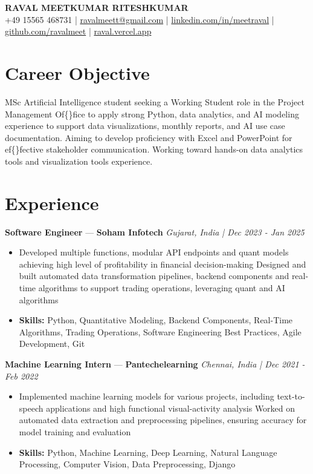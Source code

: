 \documentclass[a4paper,10pt]{article}
\begin{document}
\begin{center}
  {\Large\bfseries RAVAL MEETKUMAR RITESHKUMAR}\\[2pt]
  {\small +49 15565 468731 \;|\; \href{mailto:ravalmeett@gmail.com}{ravalmeett@gmail.com} \;|\; \href{https://www.linkedin.com/in/meetraval/}{linkedin.com/in/meetraval} \;|\; \href{https://github.com/ravalmeet}{github.com/ravalmeet} \;|\; \href{https://raval.vercel.app/}{raval.vercel.app}}
\end{center}
\vspace{-3pt}

\section*{Career Objective}
MSc Artificial Intelligence student seeking a Working Student role in the Project Management Of\{\}fice to apply strong Python, data analytics, and AI modeling experience to support data visualizations, monthly reports, and AI use case documentation. Aiming to develop proficiency with Excel and PowerPoint for ef\{\}fective stakeholder communication. Working toward hands-on data analytics tools and visualization tools experience.\par

\section*{Experience}
\textbf{Software Engineer} — \textbf{Soham Infotech} \hfill \textit{Gujarat, India \;|\; Dec 2023 - Jan 2025}\par
\vspace{1pt}
\begin{itemize}
  \item Developed multiple functions, modular API endpoints and quant models achieving high level of profitability in financial decision-making Designed and built automated data transformation pipelines, backend components and real-time algorithms to support trading operations, leveraging quant and AI algorithms
  \item \textbf{Skills:} Python, Quantitative Modeling, Backend Components, Real-Time Algorithms, Trading Operations, Software Engineering Best Practices, Agile Development, Git
\end{itemize}
\vspace{3pt}
\textbf{Machine Learning Intern} — \textbf{Pantechelearning} \hfill \textit{Chennai, India \;|\; Dec 2021 - Feb 2022}\par
\vspace{1pt}
\begin{itemize}
  \item Implemented machine learning models for various projects, including text-to-speech applications and high functional visual-activity analysis Worked on automated data extraction and preprocessing pipelines, ensuring accuracy for model training and evaluation
  \item \textbf{Skills:} Python, Machine Learning, Deep Learning, Natural Language Processing, Computer Vision, Data Preprocessing, Django
\end{itemize}
\end{document}

